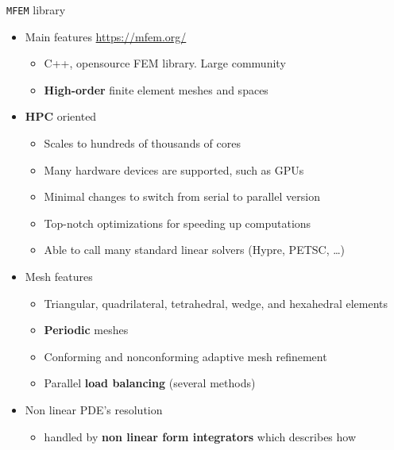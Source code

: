 \documentclass{beamer}
\begin{document}
\begin{frame}[fragile]{\texttt{MFEM} library}
\begin{itemize}
\item
  Main features \hspace*{2mm} {\small \url{https://mfem.org/}}
  \begin{itemize} 
  \item
    C++, opensource FEM library. Large community 
  \item
    \textbf{High-order} finite element meshes and spaces
  \end{itemize}
\end{itemize}
\vspace*{1mm}
\begin{itemize}
\item  \textbf{HPC} oriented
 \begin{itemize}
  \item
    Scales to hundreds of thousands of cores
  \item
    Many hardware devices are supported, such as GPUs
  \item
    Minimal changes to switch from serial to parallel version
  \item
    Top-notch optimizations for speeding up computations
  \item
    Able to call many standard linear solvers (Hypre, PETSC, \ldots)
  \end{itemize}
\end{itemize}
\vspace*{1mm}
\begin{itemize}
\item
  Mesh features
  \begin{itemize}
  \item
    Triangular, quadrilateral, tetrahedral, wedge, and hexahedral
    elements
  \item
    \textbf{Periodic} meshes
  \item
    Conforming and nonconforming adaptive mesh refinement
  \item
    Parallel \textbf{load balancing} (several methods)
  \end{itemize}
\end{itemize}
\vspace*{1mm}
\begin{itemize}
\item
  Non linear PDE's resolution
  \begin{itemize}
  \item
    handled by \textbf{non linear form integrators} which describes how

\end{itemize}
\end{itemize}
\end{frame}
\end{document}
